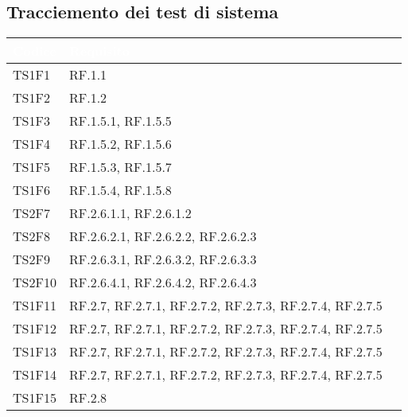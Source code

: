     \subsection{Tracciemento dei test di sistema }
    \begin{center}
        \renewcommand\arraystretch{1.5}
        \centering
        \begin{longtable}{|p{1.5cm}|p{11cm}|p{1cm}|}
        \hline
        \rowcolor[HTML]{036400}
        \textcolor{white}{\textbf{Codice}} & \textcolor{white}{\textbf{Requisito}} \\ \hline
            \rowcolor[HTML]{EFEFEF}
            TS1F1 & RF.1.1\\ \hline
            \rowcolor[HTML]{C0C0C0}
            TS1F2 & RF.1.2\\ \hline
            \rowcolor[HTML]{EFEFEF}
            TS1F3 & RF.1.5.1, RF.1.5.5\\ \hline
            \rowcolor[HTML]{C0C0C0}
            TS1F4 & RF.1.5.2, RF.1.5.6\\ \hline
            \rowcolor[HTML]{EFEFEF}
            TS1F5 & RF.1.5.3, RF.1.5.7\\ \hline
            \rowcolor[HTML]{C0C0C0}
            TS1F6 & RF.1.5.4, RF.1.5.8\\ \hline
            \rowcolor[HTML]{EFEFEF}
            TS2F7 & RF.2.6.1.1, RF.2.6.1.2\\ \hline
            \rowcolor[HTML]{C0C0C0}
            TS2F8 & RF.2.6.2.1, RF.2.6.2.2, RF.2.6.2.3 \\ \hline
            \rowcolor[HTML]{EFEFEF}
            TS2F9 & RF.2.6.3.1, RF.2.6.3.2, RF.2.6.3.3 \\ \hline
            \rowcolor[HTML]{C0C0C0}
            TS2F10 & RF.2.6.4.1, RF.2.6.4.2, RF.2.6.4.3\\ \hline
            \rowcolor[HTML]{EFEFEF}
            TS1F11 & RF.2.7, RF.2.7.1, RF.2.7.2, RF.2.7.3, RF.2.7.4, RF.2.7.5\\ \hline
            \rowcolor[HTML]{C0C0C0}
            TS1F12 & RF.2.7, RF.2.7.1, RF.2.7.2, RF.2.7.3, RF.2.7.4, RF.2.7.5\\ \hline
            \rowcolor[HTML]{EFEFEF}
            TS1F13 & RF.2.7, RF.2.7.1, RF.2.7.2, RF.2.7.3, RF.2.7.4, RF.2.7.5\\ \hline
            \rowcolor[HTML]{C0C0C0}
            TS1F14 & RF.2.7, RF.2.7.1, RF.2.7.2, RF.2.7.3, RF.2.7.4, RF.2.7.5\\ \hline
            \rowcolor[HTML]{EFEFEF}
            TS1F15 & RF.2.8\\ \hline

\end{longtable}
\end{center}
